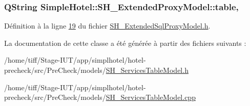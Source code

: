 \hypertarget{classSimpleHotel_1_1SH__ExtendedProxyModel_a98cd3050230163561b4dac11a9675b8e}{
\subsubsection[{table}]{\setlength{\rightskip}{0pt plus 5cm}Q\-String Simple\-Hotel\-::\-S\-H\-\_\-\-Extended\-Proxy\-Model\-::table\hspace{0.3cm}{\ttfamily [read]}, {\ttfamily [inherited]}}}\label{classSimpleHotel_1_1SH__ExtendedProxyModel_a98cd3050230163561b4dac11a9675b8e}


Définition à la ligne \hyperlink{SH__ExtendedSqlProxyModel_8h_source_l00019}{19} du fichier \hyperlink{SH__ExtendedSqlProxyModel_8h_source}{S\-H\-\_\-\-Extended\-Sql\-Proxy\-Model.\-h}.



La documentation de cette classe a été générée à partir des fichiers suivants \-:\begin{DoxyCompactItemize}
\item 
/home/tiff/\-Stage-\/\-I\-U\-T/app/simplhotel/hotel-\/precheck/src/\-Pre\-Check/models/\hyperlink{SH__ServicesTableModel_8h}{S\-H\-\_\-\-Services\-Table\-Model.\-h}\item 
/home/tiff/\-Stage-\/\-I\-U\-T/app/simplhotel/hotel-\/precheck/src/\-Pre\-Check/models/\hyperlink{SH__ServicesTableModel_8cpp}{S\-H\-\_\-\-Services\-Table\-Model.\-cpp}\end{DoxyCompactItemize}
